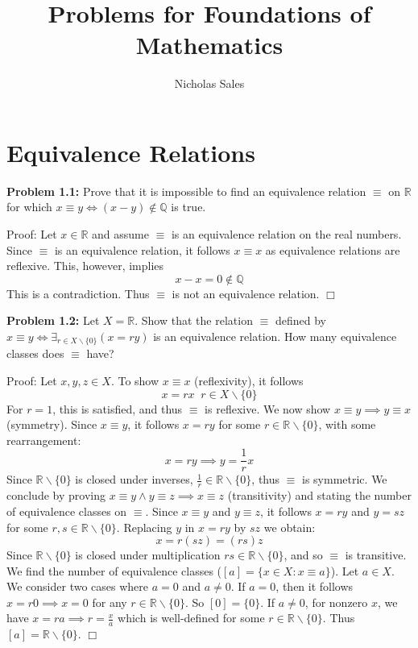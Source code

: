 \documentclass[11pt]{article}
\title{Problems for Foundations of Mathematics}
\author{Nicholas Sales}
\date{} %
\begin{document}
\maketitle

\tableofcontents
\newpage
    
\section{Equivalence Relations}

\textbf{Problem 1.1:} Prove that it is impossible to find an equivalence relation $\equiv$ on $\mathbb{R}$ for which $x \equiv y \iff (x - y) \notin \mathbb{Q}$ is true.

Proof: Let $x \in \mathbb{R}$ and assume $\equiv$ is an equivalence relation on the real numbers. Since $\equiv$ is an equivalence relation, it follows $x \equiv x$ as equivalence relations are reflexive. This, however, implies
\begin{equation*}
    x - x = 0 \notin \mathbb{Q}
\end{equation*}
This is a contradiction. Thus $\equiv$ is not an equivalence relation. $\Box$

\textbf{Problem 1.2:} Let $X = \mathbb{R}$. Show that the relation $\equiv$ defined by $x \equiv y \iff \exists_{r \in X \backslash \{0\}} (x = ry)$ is an equivalence relation. How many equivalence classes does $\equiv$ have?

Proof: Let $x, y, z \in X$. To show $x \equiv x$ (reflexivity), it follows
\begin{equation*}
    x = rx \; \; r \in X \backslash \{0\}
\end{equation*}
For $r = 1$, this is satisfied, and thus $\equiv$ is reflexive. We now show $x \equiv y \implies y \equiv x$ (symmetry). Since $x \equiv y$, it follows $x = ry$ for some $r \in \mathbb{R} \backslash \{0\}$, with some rearrangement:
\begin{equation*}
    x = ry \implies y = \frac{1}{r} x
\end{equation*}
Since $\mathbb{R} \backslash \{0\}$ is closed under inverses, $\frac{1}{r} \in \mathbb{R} \backslash \{0\}$, thus $\equiv$ is symmetric. We conclude by proving $x \equiv y \land y \equiv z \implies x \equiv z$ (transitivity) and stating the number of equivalence classes on $\equiv$. Since $x \equiv y$ and $y \equiv z$, it follows $x = ry$ and $y = sz$ for some $r, s \in \mathbb{R} \backslash \{0\}$. Replacing $y$ in $x = ry$ by $sz$ we obtain:
\begin{equation*}
    x = r(sz) = (rs)z
\end{equation*}
Since $\mathbb{R} \backslash \{0\}$ is closed under multiplication $rs \in \mathbb{R} \backslash \{0\}$, and so $\equiv$ is transitive. We find the number of equivalence classes ($[a] = \{x \in X : x \equiv a\}$). Let $a \in X$. We consider two cases where $a = 0$ and $a \neq 0$. If $a = 0$, then it follows $x = r0 \implies x = 0$ for any $r \in \mathbb{R} \backslash \{0\}$. So $[0] = \{0\}$. If $a \neq 0$,  for nonzero $x$, we have $x = ra \implies r = \frac{x}{a}$ which is well-defined for some $r \in \mathbb{R} \backslash \{0\}$. Thus $[a] = \mathbb{R} \backslash \{0\}$. $\Box$
\end{document}
